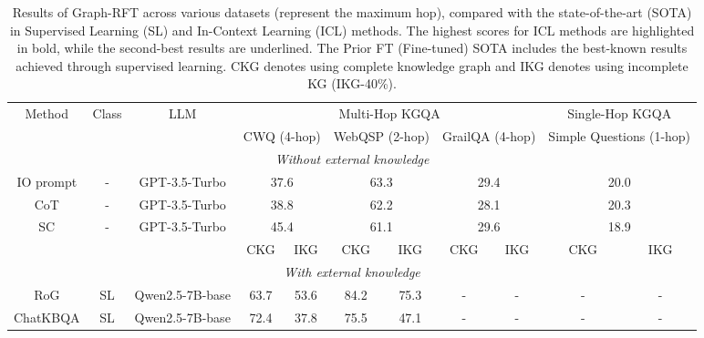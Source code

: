 \documentclass[sigconf]{acmart}
\begin{document}
\begin{table}[t]
\caption{Results of Graph-RFT across various datasets (represent the maximum hop), compared with the state-of-the-art (SOTA) in Supervised Learning (SL) and In-Context Learning (ICL) methods. The highest scores for ICL methods are highlighted in bold, while the second-best results are underlined. The Prior FT (Fine-tuned) SOTA includes the best-known results achieved through supervised learning. CKG denotes using complete knowledge graph and IKG denotes using incomplete KG (IKG-40\%).}
\label{fig:mainresult}
\small
\begin{tabular}{@{}ccccccccccc@{}}
\toprule
Method        & Class & LLM           & \multicolumn{6}{c}{Multi-Hop KGQA}   & \multicolumn{2}{c}{Single-Hop KGQA} \\ \cmidrule(lr){4-9}
              &       &               & \multicolumn{2}{c}{CWQ (4-hop)}  & \multicolumn{2}{c}{WebQSP (2-hop)}        & \multicolumn{2}{c}{GrailQA (4-hop)}       & \multicolumn{2}{c}{Simple Questions (1-hop)}    \\ \midrule
\multicolumn{11}{c}{\textit{Without external knowledge}}                                                                   \\\midrule
IO prompt\cite{sun2023think}     & -     & GPT-3.5-Turbo & \multicolumn{2}{c}{37.6} & \multicolumn{2}{c}{63.3}          & \multicolumn{2}{c}{29.4}          & \multicolumn{2}{c}{20.0}                      \\
CoT\cite{sun2023think}            & -     & GPT-3.5-Turbo & \multicolumn{2}{c}{38.8} & \multicolumn{2}{c}{62.2}          & \multicolumn{2}{c}{28.1}          & \multicolumn{2}{c}{20.3}                     \\
SC\cite{sun2023think}             & -     & GPT-3.5-Turbo & \multicolumn{2}{c}{45.4} & \multicolumn{2}{c}{61.1}          & \multicolumn{2}{c}{29.6}          & \multicolumn{2}{c}{18.9}                     \\ \midrule
 &       &               & CKG  & IKG  &  CKG & IKG       & CKG   & IKG       & CKG  & IKG   \\ \midrule
\multicolumn{11}{c}{\textit{With external knowledge}}                                                                      \\ \midrule
RoG  \cite{luo2023reasoning}  & SL    & Qwen2.5-7B-base        & 63.7 & 53.6 & 84.2 & 75.3        & -   & -     & -    & -           \\
ChatKBQA \cite{luo2023chatkbqa}  & SL     & Qwen2.5-7B-base      & 72.4  & 37.8 & 75.5      & 47.1    & -   & -     & -   & - \\ 

\end{tabular}
\end{table}
\end{document}
